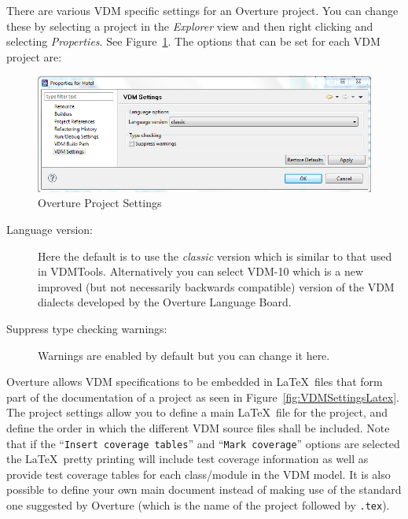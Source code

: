 \documentclass{overturerepchap}
\begin{document}
There are various VDM
specific settings for an Overture project. You can change these by
selecting a project
in the \emph{Explorer} view and then right clicking and selecting
\emph{Properties}. See Figure~\ref{fig:VDMSettings}. The options 
that can be set for each VDM project are:

\begin{figure}[!hbt]
\begin{center}
  \includegraphics[width=\textwidth]{screenDumps/projectsettings}
  \caption[Overture Project Settings]{Overture Project Settings}
  \label{fig:VDMSettings}
\end{center}
\end{figure}

\begin{description}
\item[Language version:] Here the default is to use the
  \emph{classic} version which is similar to that used in
  VDMTools. Alternatively you can select VDM-10 which
  is a new improved (but not necessarily backwards compatible) version of
  the VDM dialects developed by the Overture Language Board. 
\item[Suppress type checking warnings:] Warnings are enabled
  by default but you can change it here.
\end{description}

Overture allows VDM specifications to be embedded in \LaTeX\ files that
form part of the documentation of a project as seen in
Figure~\ref{fig:VDMSettingsLatex}. The project settings allow you
to define a main \LaTeX\ file for the project, and define the order in which the
different VDM source files shall be included. Note that if the
``\texttt{Insert coverage tables}'' and ``\texttt{Mark coverage}''
options are selected the \LaTeX\ pretty printing will include test
coverage information as well as provide test coverage tables for each
class/module in the VDM model. It is also possible to define your own
main document instead of making use of the standard one suggested by
Overture (which is the name of the project followed by \texttt{.tex}).
\end{document}
